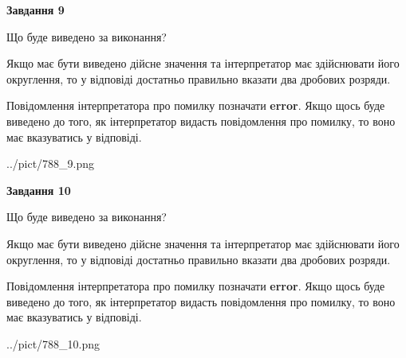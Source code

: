 \documentclass[12pt, ukrainian]{article}
\begin{document}
{\begin {Large}
{\begin {center}\textbf{Завдання 9}\end {center}}\par
Що буде виведено за виконання? \par

Якщо має бути виведено дійсне значення та інтерпретатор має здійснювати його округлення, 
то у відповіді достатньо правильно вказати два дробових розряди.

Повідомлення інтерпретатора про помилку позначати \textbf{error}.
Якщо щось буде виведено до того, як інтерпретатор видасть повідомлення про помилку, 
то воно має вказуватись у відповіді. \par

\begin{center}
	{../pict/788_9.png}
\end{center}
\newpage

{\begin {center}\textbf{Завдання 10}\end {center}}\par
Що буде виведено за виконання? \par

Якщо має бути виведено дійсне значення та інтерпретатор має здійснювати його округлення, 
то у відповіді достатньо правильно вказати два дробових розряди.

Повідомлення інтерпретатора про помилку позначати \textbf{error}.
Якщо щось буде виведено до того, як інтерпретатор видасть повідомлення про помилку, 
то воно має вказуватись у відповіді. \par

\begin{center}
	{../pict/788_10.png}
\end{center}
\newpage

\end {Large}}
\end{document}
